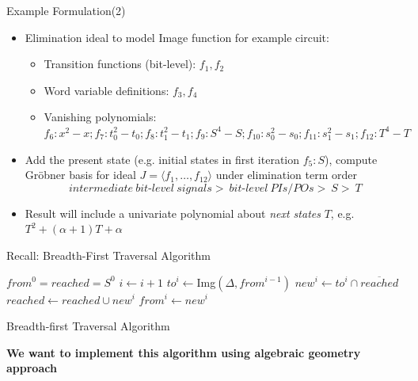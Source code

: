 \documentclass[xcolor=dvipsnames]{beamer}
\newcommand{\bi}{\begin{itemize}}
\newcommand{\ei}{\end{itemize}}
\begin{document}
\begin{frame}{\large{Example Formulation(2)}}
\bi
\item Elimination ideal to model Image function for example circuit:
\begin{itemize}
\item Transition functions (bit-level): $f_1,f_2$\\

\item Word variable definitions: $f_3,f_4$\\

\item Vanishing polynomials: $f_6: x^2 - x; f_7: t_0^2 - t_0; f_8: t_1^2 - t_1; f_9: S^4 - S; f_{10}: s_0^2 - s_0;
f_{11}: s_1^2 - s_1; f_{12}: T^4 - T$
\end{itemize}
\item Add the present state (e.g. initial states in first iteration $f_5: S$), compute Gr\"obner basis
for ideal $J = \langle f_1,\dots, f_{12}\rangle$ under elimination term order $$intermediate\ bit\text{-}level\ signals >\ bit\text{-}level\ PIs/POs >\ S >\ T$$
\item  Result will include a univariate polynomial about \emph{next states} $T$, e.g. $T^2+(\alpha+1)T+\alpha$ 
\ei
\end{frame}

\begin{frame}{\large{Recall: Breadth-First Traversal Algorithm}}
\begin{algorithm}[H]
\SetAlgoNoLine
  $from^0 = reached = S^0$\;
  {
  	$i \gets i + 1$\;
	$to^i \gets$Img$(\Delta, from^{i-1})$\;
	$new^i \gets to^i \cap \overline{reached}$\;
  	$reached \gets reached \cup new^i$\;
	$from^i \gets new^i$\;
  }
\caption {Breadth-first Traversal Algorithm}
\end{algorithm}
\vspace{0.2in}
\textbf{We want to implement this algorithm using algebraic geometry approach}
\end{frame}
\end{document}
